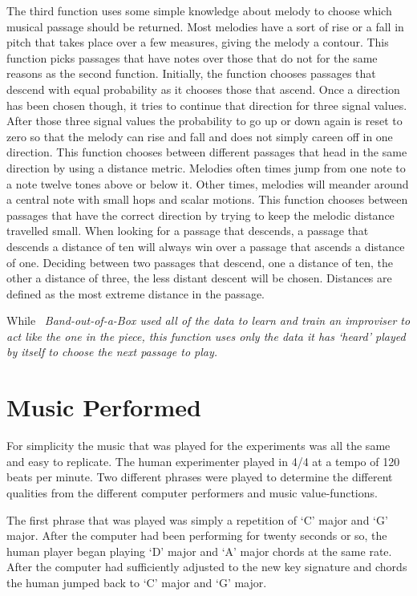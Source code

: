 \documentclass[12pt]{ucthesis}
\begin{document}
The third function uses some simple knowledge about melody to choose which musical passage should be returned. Most melodies have a sort of rise or a fall in pitch that takes place over a few measures, giving the melody a contour. This function picks passages that have notes over those that do not for the same reasons as the second function. Initially, the function chooses passages that descend with equal probability as it chooses those that ascend. Once a direction has been chosen though, it tries to continue that direction for three signal values. After those three signal values the probability to go up or down again is reset to zero so that the melody can rise and fall and does not simply careen off in one direction. This function chooses between different passages that head in the same direction by using a distance metric. Melodies often times jump from one note to a note twelve tones above or below it. Other times, melodies will meander around a central note with small hops and scalar motions. This function chooses between passages that have the correct direction by trying to keep the melodic distance travelled small. When looking for a passage that descends, a passage that descends a distance of ten will always win over a passage that ascends a distance of one. Deciding between two passages that descend, one a distance of ten, the other a distance of three, the less distant descent will be chosen. Distances are defined as the most extreme distance in the passage.

While ~\em{Band-out-of-a-Box }\em used all of the data to learn and train an improviser to act like the one in the piece, this function uses only the data it has `heard' played by itself to choose the next passage to play. 

\section{Music Performed}
\label{music-performed}
For simplicity the music that was played for the experiments was all the same and easy to replicate. The human experimenter played in 4/4 at a tempo of 120 beats per minute. Two different phrases were played to determine the different qualities from the different computer performers and music value-functions. 

The first phrase that was played was simply a repetition of `C' major and `G' major. After the computer had been performing for twenty seconds or so, the human player began playing `D' major and `A' major chords at the same rate. After the computer had sufficiently adjusted to the new key signature and chords the human jumped back to `C' major and `G' major. 
\end{document}
